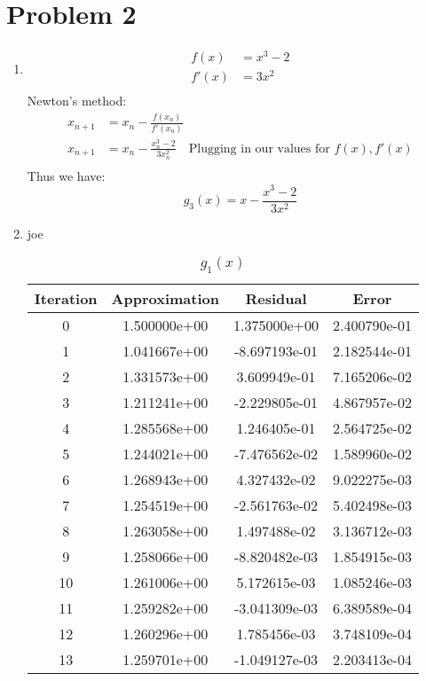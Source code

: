 \documentclass{article}
\begin{document}
\section*{Problem 2}
\begin{enumerate}[label=\alph*.)]
\item 
\begin{align*}
f(x) &= x^3 - 2 \\
f'(x) &= 3x^2 \\
\end{align*}
Newton's method: \\
\begin{align*}
x_{n+1} &= x_n - \frac{f(x_n)}{f'(x_n)} \\
x_{n+1} &= x_n - \frac{x_n^3 - 2}{3x_n^2} \quad \mbox{Plugging in our values for $f(x), f'(x)$}\\
\end{align*}
Thus we have:
\[
g_3(x) = x - \frac{x^3 - 2}{3x^2} 
\]
\item joe\\
\begin{table}[h]
\centering
\caption{$g_1(x)$}
\begin{tabular}{|c|c|c|c|}
\hline
Iteration & Approximation & Residual & Error \\
\hline
0 & 1.500000e+00 & 1.375000e+00 & 2.400790e-01 \\
\hline
1 & 1.041667e+00 & -8.697193e-01 & 2.182544e-01 \\
\hline
2 & 1.331573e+00 & 3.609949e-01 & 7.165206e-02 \\
\hline
3 & 1.211241e+00 & -2.229805e-01 & 4.867957e-02 \\
\hline
4 & 1.285568e+00 & 1.246405e-01 & 2.564725e-02 \\
\hline
5 & 1.244021e+00 & -7.476562e-02 & 1.589960e-02 \\
\hline
6 & 1.268943e+00 & 4.327432e-02 & 9.022275e-03 \\
\hline
7 & 1.254519e+00 & -2.561763e-02 & 5.402498e-03 \\
\hline
8 & 1.263058e+00 & 1.497488e-02 & 3.136712e-03 \\
\hline
9 & 1.258066e+00 & -8.820482e-03 & 1.854915e-03 \\
\hline
10 & 1.261006e+00 & 5.172615e-03 & 1.085246e-03 \\
\hline
11 & 1.259282e+00 & -3.041309e-03 & 6.389589e-04 \\
\hline
12 & 1.260296e+00 & 1.785456e-03 & 3.748109e-04 \\
\hline
13 & 1.259701e+00 & -1.049127e-03 & 2.203413e-04 \\

\end{tabular}
\end{table}
\end{enumerate}
\end{document}
